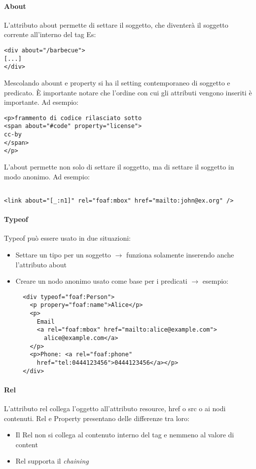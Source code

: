 \paragraph*{About}L'attributo about permette di settare il soggetto, che diventer\`a il soggetto corrente all'interno del tag
Es:
\begin{verbatim}
<div about="/barbecue">
[...]
</div>
\end{verbatim}

Mescolando abount e property si ha il setting contemporaneo di soggetto e predicato. \`E importante notare che l'ordine con cui gli attributi vengono inseriti \`e importante. Ad esempio:
\begin{verbatim}
<p>frammento di codice rilasciato sotto
<span about="#code" property="license">
cc-by
</span>
</p>
\end{verbatim}

L'about permette non solo di settare il soggetto, ma di settare il soggetto in modo anonimo. Ad esempio:
\begin{verbatim}

<link about="[_:n1]" rel="foaf:mbox" href="mailto:john@ex.org" />
\end{verbatim}

\paragraph*{Typeof}
Typeof pu\`o essere usato in due situazioni:
\begin{itemize}
  
\item Settare un tipo per un soggetto $\to$ funziona solamente inserendo anche l'attributo about
\item Creare un nodo anonimo usato come base per i predicati $\to$ esempio:
\begin{verbatim}
  <div typeof="foaf:Person">
    <p propery="foaf:name">Alice</p>
    <p>
      Email
      <a rel="foaf:mbox" href="mailto:alice@example.com">
        alice@example.com</a>
    </p>
    <p>Phone: <a rel="foaf:phone"
      href="tel:0444123456">0444123456</a></p>
  </div>

\end{verbatim}

\end{itemize}

\paragraph*{Rel}L'attributo rel collega l'oggetto all'attributo resource, href o src o ai nodi contenuti. Rel e Property presentano delle differenze tra loro:
\begin{itemize}

\item Il Rel non si collega al contenuto interno del tag e nemmeno al valore di content
\item Rel supporta il \textit{chaining}
  
\end{itemize}

